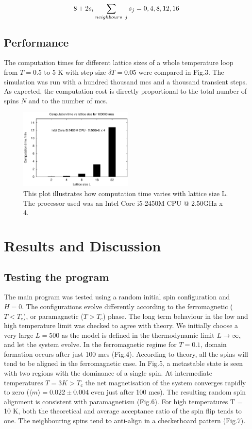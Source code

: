 \documentclass[a4paper]{article}
\begin{document}
\begin{equation}
8 + 2 s_i \sum_{\substack{ neighbours \hspace{1.5mm} j}} s_j = 0,4,8,12,16
\end{equation}


\subsection{Performance}

The computation times for different lattice sizes of a whole temperature loop from $T = 0.5$ to $5$ K with step size $\delta T = 0.05$ were compared in Fig.3.
The simulation was run with a hundred thousand mcs and a thousand transient steps. As expected, the computation cost is directly proportional to the total number of spins $N$ and to the number of mcs.

\begin{figure}[H]
\centering
\includegraphics[width=0.51\textwidth]{histogram.eps}
\caption{This plot illustrates how computation time varies with lattice size L. The processor used was an Intel Core i5-2450M CPU @ 2.50GHz x 4.}
\end{figure}

 
\section{Results and Discussion}
\subsection{Testing the program}

The main program was tested using a random initial spin configuration and $H = 0$. The configurations evolve differently according to the ferromagnetic ($T < T_c$), or paramagnetic ($T > T_c$) phase. The long term behaviour in the low and high temperature limit was checked to agree with theory. We initially choose a very large $L = 500$ as the model is defined in the thermodynamic limit $L \rightarrow \infty$, and let the system evolve. In the ferromagnetic regime for $T = 0.1$, domain formation occurs after just 100 mcs (Fig.4). According to theory, all the spins will tend to be aligned in the ferromagnetic case. In Fig.5, a metastable state is seen with two  regions with the dominance of a single spin. At intermediate temperatures $T = 3K > T_c$ the net magnetisation of the system converges rapidly to zero ($\langle m \rangle = 0.022 \pm 0.004$ even just after 100 mcs). The resulting random spin alignment is consistent with paramagnetism (Fig.6). For high temperatures T = 10 K, both the theoretical and average acceptance ratio of the spin flip tends to one. The neighbouring spins tend to anti-align in a checkerboard pattern (Fig.7). 
\end{document}

